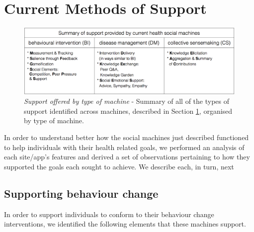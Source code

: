 \documentclass{sig-alternate}
\begin{document}
\section{Current Methods of Support}
\label{sec:support}
\begin{figure}[htb]
\begin{center}
\includegraphics[width=14cm]{img/table2-summary.png}
\caption{\emph{Support offered by type of machine} - Summary of all of
  the types of support identified across machines, described in
  Section \ref{sec:support}, organised by type of machine.} \label{fig:summaryofsupport}
\end{center}
\end{figure}


In order to understand better how the social machines just described
functioned to help individuals with their health related goals, we
performed an analysis of each site/app's features and derived a set of
observations pertaining to how they supported the goals each sought to
achieve.  We describe each, in turn, next

\subsection{Supporting behaviour change}
\label{sec:intervention}

In order to support individuals to conform to their behaviour change
interventions, we identified the following elements that these machines
support.
\end{document}
